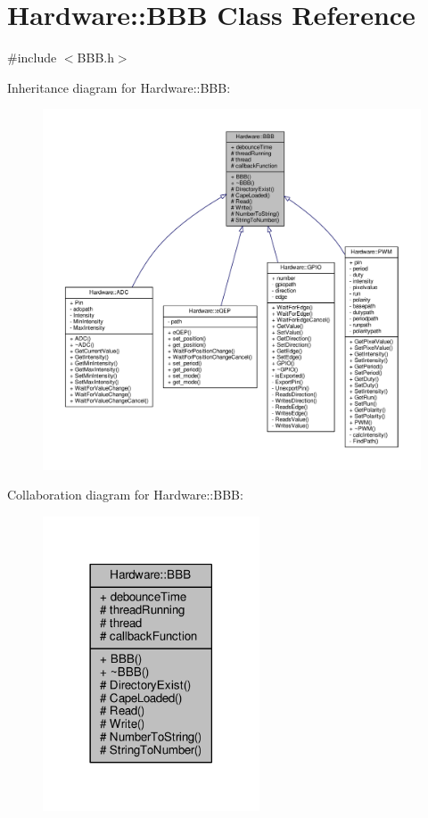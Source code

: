 \hypertarget{class_hardware_1_1_b_b_b}{}\section{Hardware\+:\+:B\+B\+B Class Reference}
\label{class_hardware_1_1_b_b_b}


{\ttfamily \#include $<$B\+B\+B.\+h$>$}



Inheritance diagram for Hardware\+:\+:B\+B\+B\+:\nopagebreak
\begin{figure}[H]
\begin{center}
\leavevmode
\includegraphics[width=350pt]{class_hardware_1_1_b_b_b__inherit__graph}
\end{center}
\end{figure}


Collaboration diagram for Hardware\+:\+:B\+B\+B\+:\nopagebreak
\begin{figure}[H]
\begin{center}
\leavevmode
\includegraphics[width=182pt]{class_hardware_1_1_b_b_b__coll__graph}
\end{center}
\end{figure}

